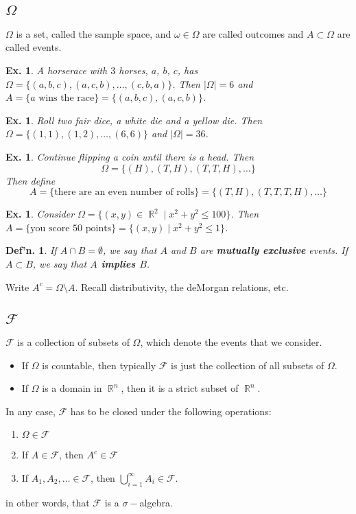 \documentclass[12pt, a4paper]{book}
\DeclareMathOperator{\R}{\mathbb{R}}
\newtheorem{definition}[theorem]{Def'n.}
\newtheorem{example}[theorem]{Ex.}
\theoremstyle{nonumberplain}
\begin{document}
\subsection{$\Omega$}
$\Omega$ is a set, called the sample space, and $\omega\in\Omega$ are called outcomes and $A\subset\Omega$ are called events.
\begin{example}
    A horserace with $3$ horses, $a$, $b$, $c$, has $\Omega=\{(a,b,c),(a,c,b),\ldots,(c,b,a)\}$.
    Then $|\Omega|=6$ and $A=\{a\text{ wins the race}\}=\{(a,b,c),(a,c,b)\}$.
\end{example}
\begin{example}
    Roll two fair dice, a white die and a yellow die.
    Then $\Omega=\{(1,1),(1,2),\ldots,(6,6)\}$ and $|\Omega|=36$.
\end{example}
\begin{example}
    Continue flipping a coin until there is a head.
    Then
    \[\Omega=\{(H),(T,H),(T,T,H),\ldots\}\]
    Then define
    \[A=\{\text{there are an even number of rolls}\}=\{(T,H),(T,T,T,H),\ldots\}\]
\end{example}
\begin{example}
    Consider $\Omega=\{(x,y)\in\R^2\mid x^2+y^2\leq 100\}$.
    Then $A=\{\text{you score 50 points}\}=\{(x,y)\mid x^2+y^2\leq 1\}$.
\end{example}
\begin{definition}
    If $A\cap B=\emptyset$, we say that $A$ and $B$ are \textbf{mutually exclusive} events.
    If $A\subset B$, we say that \textbf{$A$ implies $B$}.
\end{definition}
Write $A^c=\Omega\setminus A$.
Recall distributivity, the deMorgan relations, etc.
\subsection{$\mathcal{F}$}
$\mathcal{F}$ is a collection of subsets of $\Omega$, which denote the events that we consider.
\begin{itemize}[nolistsep]
    \item If $\Omega$ is countable, then typically $\mathcal{F}$ is just the collection of all subsets of $\Omega$.
    \item If $\Omega$ is a domain in $\R^n$, then it is a strict subset of $\R^n$.
\end{itemize}
In any case, $\mathcal{F}$ has to be closed under the following operations:
\begin{enumerate}
    \item $\Omega\in\mathcal{F}$
    \item If $A\in\mathcal{F}$, then $A^c\in\mathcal{F}$
    \item If $A_1,A_2,\ldots\in\mathcal{F}$, then $\bigcup\limits_{i=1}^\infty A_i\in\mathcal{F}$.
\end{enumerate}
in other words, that $\mathcal{F}$ is a $\sigma-$algebra.
\end{document}
